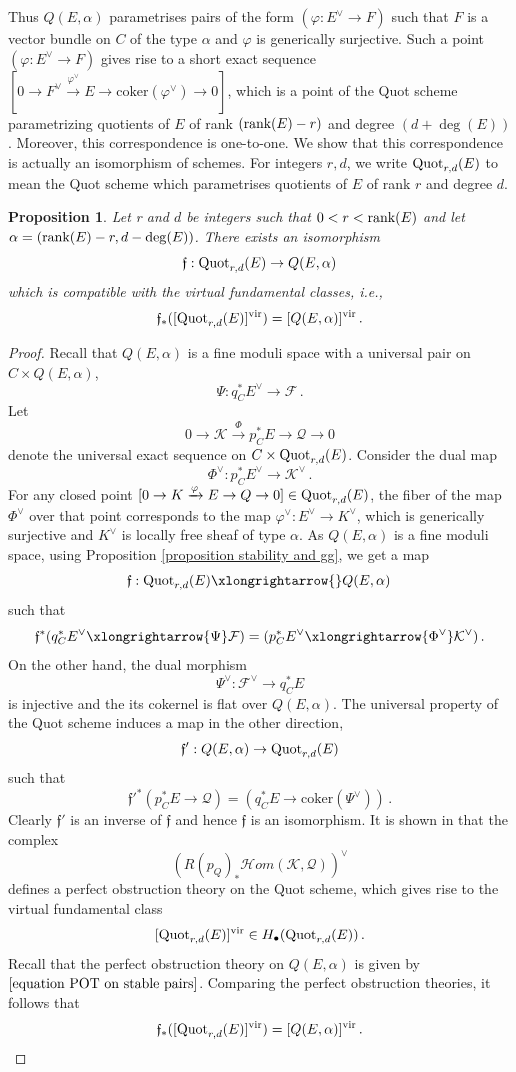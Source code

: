 \documentclass[11pt]{amsart}
\newtheorem{proposition}[theorem]{Proposition}
\theoremstyle{remark}
\newcommand{\Q}{\mathcal{Q}}
\newcommand{\mf}[1]{\mathfrak{#1}}
\newcommand{\mF}[0]{\mathcal F}
\newcommand{\K}{\mathcal{K}}
\newcommand{\coker}{\text{coker}}
\newcommand{\rk}{\textnormal{rank}}
\newcommand{\HOM}[0]{\mathscr{H}om}
\newcommand{\vp}[0]{\varphi}
\newcommand{\quot}[0]{\textnormal{Quot}}
\newcommand{\vir}[0]{\textnormal{vir}}
\numberwithin{theorem}{section}
\begin{document}
    Thus $Q(E,\alpha)$ parametrises pairs of the form 
    $(\vp: E^\vee \to F)$ such that $F$ is a vector bundle on $C$
    of the type $\alpha$ and $\vp$ is generically surjective.
    Such a point $(\vp: E^\vee \to F)$ gives rise to a short exact sequence 
    $[0 \to F^\vee \xrightarrow{\vp^\vee} E \to \coker(\vp^\vee) \to 0]$,
    which is a point of the Quot scheme parametrizing quotients of $E$
    of rank $(\rk(E)-r)$ and degree $(d+\deg(E))$.
    Moreover, this correspondence is one-to-one.
    We show that this correspondence is actually an isomorphism of schemes.
    For integers $r,d$, we write $\quot_{r,d}(E)$ to mean the Quot scheme
    which parametrises quotients of $E$ of rank $r$ and degree $d$.
    \begin{proposition}\label{proposition isomorphism Quot and Q}
        Let r and $d$ be integers such that $0<r<\rk(E)$
        and let $\alpha = (\rk(E)-r,d-\deg(E))$.
        There exists an isomorphism
        $$\mf f: \quot_{r,d}(E) \to Q(E,\alpha)$$
        which is compatible with the virtual fundamental classes, i.e.,
        $$ \mf f_*([\quot_{r,d}(E)]^\vir) = [Q(E,\alpha)]^\vir\,.$$
    \end{proposition}
    \begin{proof}
    Recall that $Q(E,\alpha)$ is a fine moduli space with a universal pair on $C \times Q(E,\alpha)$,
    $$ \Psi: q_C^*E^\vee \to \mF\,.$$
    Let
    $$0 \to \K \xrightarrow{\Phi} p_C^*E \to \Q \to 0$$
    denote the universal exact sequence on $C \times \quot_{r,d}(E)$. 
    Consider the dual map
    $$\Phi^\vee :  p_C^*E^\vee \to \K^\vee\,.$$
    For any closed point $[0 \to K \xrightarrow{\vp} E \to Q \to 0] \in \quot_{r,d}(E)$,
    the fiber of the map $\Phi^\vee$ over that point corresponds to the map
    $\vp^\vee: E^\vee \to K^\vee$,
    which is generically surjective and $K^\vee$ is locally free sheaf of type $\alpha$.
    As $Q(E,\alpha)$ is a fine moduli space, using Proposition \ref{proposition stability and gg}, we get a map
    $$\mf f: \quot_{r,d}(E) \xlongrightarrow{} Q(E,\alpha)\,$$
    such that 
    $$\mf f^*( q_C^*E^\vee \xlongrightarrow{\Psi} \mF) = 
    (p_C^*E^\vee \xlongrightarrow{\Phi^\vee} \K^\vee)\,.$$
    On the other hand, the dual morphism
    $$ \Psi^\vee: \mF^\vee \to q_C^*E$$
    is injective and the its cokernel is flat over $Q(E,\alpha)$.
    The universal property of the Quot scheme induces a map in the other direction, 
    $$\mf f' : Q(E,\alpha) \to \quot_{r,d}(E)$$
    such that 
    $$\mf f'^*(p_C^*E \to \Q) = (q_C^*E \to \coker(\Psi^\vee))\,.$$
    Clearly $\mf f'$ is an inverse of $\mf f$
    and hence $\mf f$ is an isomorphism.
    It is shown in \cite[Theorem 1]{MO07c} that the complex 
    $$ (R(p_Q)_*\HOM(\K,\Q))^\vee$$
    defines a  perfect obstruction theory on the Quot scheme,
    which gives rise to the virtual fundamental class
    $$[\quot_{r,d}(E)]^\vir \in H_\bullet(\quot_{r,d}(E))\,.$$
    Recall that the perfect obstruction theory on $Q(E,\alpha)$
    is given by $\eqref{equation POT on stable pairs}$.
    Comparing the perfect obstruction theories,
    it follows that 
    $$ \mf f_*([\quot_{r,d}(E)]^\vir)
    = [Q(E,\alpha)]^\vir\,.$$
    \end{proof}
\end{document}
